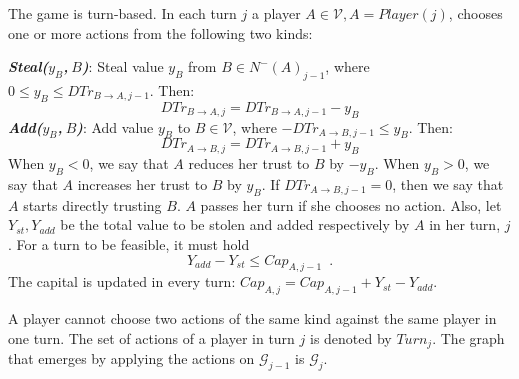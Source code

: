 \begin{definition}[Turns]
  The game is turn-based. In each turn $j$ a player $A \in \mathcal{V}, A =
  Player\left(j\right)$, chooses one or more actions from the following two kinds:

  \noindent \textit{\textbf{Steal($y_B$,$\:B$)}}: Steal value $y_B$ from $B \in N^{-}\left(A\right)_{j-1}$, where
  $0 \leq y_B \leq DTr_{B \rightarrow A, j-1}$. Then:
  \begin{equation*}
     DTr_{B \rightarrow A, j} = DTr_{B \rightarrow A, j-1} - y_B
  \end{equation*}
  \noindent \textit{\textbf{Add($y_B$,$\:B$)}}:
  Add value $y_B$ to $B \in \mathcal{V}$, where $-DTr_{A \rightarrow B, j-1} \leq y_B$. Then:
  \begin{equation*}
     DTr_{A \rightarrow B, j} = DTr_{A \rightarrow B, j-1} + y_B
  \end{equation*}
  When $y_B < 0$, we say that $A$ reduces her trust to $B$ by $-y_B$. When $y_B > 0$, we say that $A$ increases her
  trust to $B$ by $y_B$. If $DTr_{A \rightarrow B, j-1} = 0$, then we say that $A$ starts directly trusting $B$.
  $A$ passes her turn if she chooses no action. Also, let $Y_{st}, Y_{add}$ be the
  total value to be stolen and added respectively by $A$ in her turn, $j$. For a turn to be feasible, it must hold
  \begin{equation}
     Y_{add} - Y_{st} \leq Cap_{A, j-1} \enspace.
  \end{equation}
  The capital is updated in every turn: $Cap_{A, j} = Cap_{A, j-1} + Y_{st} - Y_{add}$.

  A player cannot choose two actions of the same kind against the same player in one turn.
  The set of actions of a player in turn $j$ is denoted by $Turn_j$. The graph that emerges by applying
  the actions on $\mathcal{G}_{j-1}$ is $\mathcal{G}_j$.
\end{definition}

